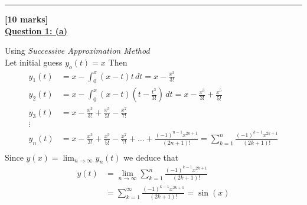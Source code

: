 \documentclass[]{article}
\begin{document}
\hrule
\textbf{[10 marks]}\\
\textbf{\underline{Question 1: (a)}}
\begin{adjustwidth}{1cm}{2cm}
    Using \textit{Successive Approximation Method}\\
    Let initial guess $\displaystyle y_{o}(t) =x$ Then
    \begin{align*}
        y_1(t) & = x -\int_0^x (x-t)t \, dt = x-\frac{x^3}{3!}                                                                                                \\
        y_2(t) & = x -\int_0^x (x-t)(t-\frac{t^3}{3!})\, dt = x-\frac{x^3}{3!}+\frac{x^5}{5!}                                                                 \\
        y_3(t) & = x-\frac{x^3}{3!}+\frac{x^5}{5!}-\frac{x^7}{7!}                                                                                             \\
        \vdots &                                                                                                                                              \\
        y_n(t) & =x-\frac{x^3}{3!}+\frac{x^5}{5!}-\frac{x^7}{7!}+\dots+ \frac{(-1)^{n-1}x^{2n+1}}{(2n+1)!} = \sum_{k=1}^{n}\frac{(-1)^{k-1}x^{2k+1}}{(2k+1)!} \\
    \end{align*}
    Since $\displaystyle y(x) = \lim_{n \to \infty} y_n(t)$ we deduce that
    \begin{align*}
        y(t) & =\lim_{n \to \infty}\sum_{k=1}^{n} \frac{(-1)^{k-1}x^{2k+1}}{(2k+1)!} \\
             & =\sum_{k=1}^{\infty} \frac{(-1)^{k-1}x^{2k+1}}{(2k+1)!} = \sin(x)
    \end{align*}
\end{adjustwidth}
\end{document}
